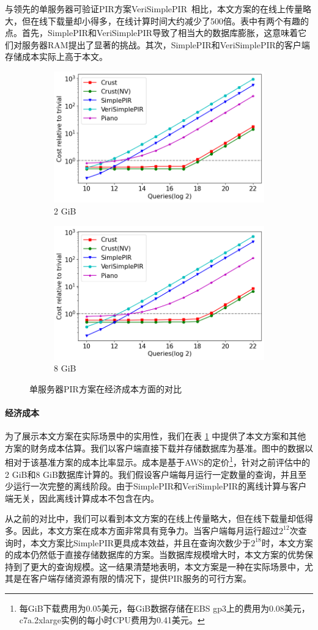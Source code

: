 与领先的单服务器可验证PIR方案VeriSimplePIR~\cite{VeriSimplePIR}相比，本文方案的在线上传量略大，但在线下载量却小得多，在线计算时间大约减少了500倍。表中有两个有趣的点。首先，SimplePIR和VeriSimplePIR导致了相当大的数据库膨胀，这意味着它们对服务器RAM提出了显著的挑战。其次，SimplePIR和VeriSimplePIR的客户端存储成本实际上高于本文。

\begin{figure}
    \begin{subfigure}{0.5\textwidth}
        \centering
        \includegraphics[width=0.8\linewidth]{figure/cost_2gb.png}
        \caption{2 GiB}
    \end{subfigure}%
    \begin{subfigure}{0.5\textwidth}
        \centering
        \includegraphics[width=0.8\linewidth]{figure/cost_8gb.png}
        \caption{8 GiB}
    \end{subfigure}%
    \caption{单服务器PIR方案在经济成本方面的对比}
    \label{fig:single-server-cost}
\end{figure}

\paragraph{经济成本}
为了展示本文方案在实际场景中的实用性，我们在表 \ref{fig:single-server-cost} 中提供了本文方案和其他方案的财务成本估算。我们以客户端直接下载并存储数据库为基准。图中的数据以相对于该基准方案的成本比率显示。成本是基于AWS的定价\footnote{每GiB下载费用为0.05美元，每GiB数据存储在EBS gp3上的费用为0.08美元，c7a.2xlarge实例的每小时CPU费用为0.41美元。}，针对之前评估中的2 GiB和8 GiB数据库计算的。我们假设客户端每月运行一定数量的查询，并且至少运行一次完整的离线阶段。由于SimplePIR和VeriSimplePIR的离线计算与客户端无关，因此离线计算成本不包含在内。

从之前的对比中，我们可以看到本文方案的在线上传量略大，但在线下载量却低得多。因此，本文方案在成本方面非常具有竞争力。当客户端每月运行超过$2^{12}$次查询时，本文方案比SimplePIR更具成本效益，并且在查询次数少于$2^{18}$时，本文方案的成本仍然低于直接存储数据库的方案。当数据库规模增大时，本文方案的优势保持到了更大的查询规模。这一结果清楚地表明，本文方案是一种在实际场景中，尤其是在客户端存储资源有限的情况下，提供PIR服务的可行方案。